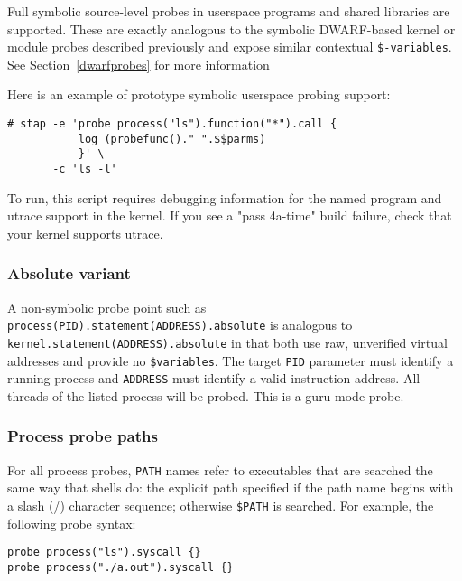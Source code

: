 \documentclass[twoside,english]{article}
\newenvironment{vindent}
{\begin{list}{}{\setlength{\listparindent}{6pt}}
\item[]}
{\end{list}}
\begin{document}
Full symbolic source-level probes in userspace programs and shared
libraries are supported.  These are exactly analogous to the symbolic
DWARF-based kernel or module probes described previously and expose
similar contextual \texttt{\$-variables}. See
Section~\ref{dwarfprobes} for more information

Here is an example of prototype symbolic userspace probing support:
\begin{vindent}
\begin{verbatim}
# stap -e 'probe process("ls").function("*").call {
           log (probefunc()." ".$$parms)
           }' \
       -c 'ls -l'
\end{verbatim}
\end{vindent}

To run, this script requires debugging information for the named
program and utrace support in the kernel. If you see a "pass 4a-time"
build failure, check that your kernel supports utrace.

\subsubsection{Absolute variant}
\label{sec:absolutevariant}
A non-symbolic probe point such as
\texttt{process(PID).statement(ADDRESS).absolute} is analogous to
\newline\texttt{kernel.statement(ADDRESS).absolute} in that both use
raw, unverified virtual addresses and provide no \texttt{\$variables}.
The target \texttt{PID} parameter must identify a running process and
\texttt{ADDRESS} must identify a valid instruction address.  All
threads of the listed process will be probed.  This is a guru mode
probe.

\subsubsection{Process probe paths}
\label{sec:paths}
For all process probes, \texttt{PATH} names refer to executables that
are searched the same way that shells do: the explicit path specified
if the path name begins with a slash (/) character sequence; otherwise
\texttt{\$PATH} is searched.  For example, the following probe syntax:
\begin{vindent}
\begin{verbatim}
probe process("ls").syscall {}
probe process("./a.out").syscall {}
\end{verbatim}
\end{vindent}
\end{document}
